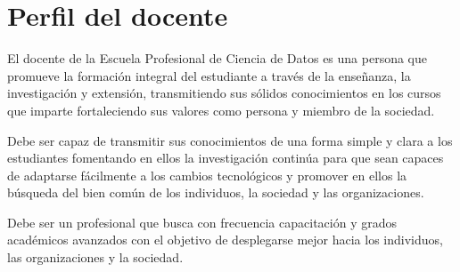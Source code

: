 \section{Perfil del docente}
El docente de la Escuela Profesional de Ciencia de Datos es una persona
que promueve la formación integral del estudiante a través de la enseñanza,
la investigación y extensión, transmitiendo sus sólidos conocimientos en los cursos que imparte
fortaleciendo sus valores como persona y miembro de la sociedad.

Debe ser capaz de transmitir sus conocimientos de una forma simple y clara a los estudiantes fomentando en ellos la investigación continúa para que sean capaces de adaptarse fácilmente a los
cambios tecnológicos y promover en ellos la búsqueda del bien común de los individuos, la sociedad y
las organizaciones.

Debe ser un profesional que busca con frecuencia capacitación y grados académicos avanzados con
el objetivo de desplegarse mejor hacia los individuos, las organizaciones y la sociedad.
